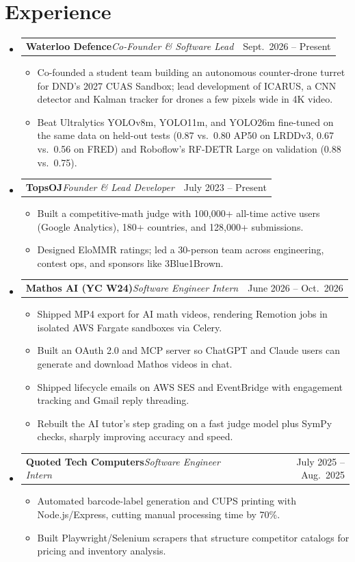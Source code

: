 \documentclass[letterpaper,11pt]{article}
\makeatletter
\newlength{\entrygap}\setlength{\entrygap}{6.5pt}        %
\newlength{\bulletgap}\setlength{\bulletgap}{2.5pt}        %
\newenvironment{entries}
  {\begin{itemize}[leftmargin=0.12in, label={}, itemsep=\entrygap, topsep=0pt, parsep=0pt, partopsep=0pt]}
  {\end{itemize}}
\newenvironment{bullets}
  {\begin{itemize}[leftmargin=0.16in, itemsep=1.25pt, topsep=\bulletgap, parsep=0pt, partopsep=0pt, label={\raisebox{0.15ex}{\scriptsize$\bullet$}}]\small}
  {\end{itemize}}
\newcommand{\role}[3]{%
  \item
  \begin{tabular*}{\linewidth}[t]{l@{\extracolsep{\fill}}r}
    \textbf{#1}\hspace{0.55em}\textit{\small #2} & #3
  \end{tabular*}}
\makeatother
\begin{document}
\section{Experience}
\begin{entries}
  \role{Waterloo Defence}{Co-Founder \& Software Lead}{Sept.\ 2026 -- Present}
  \begin{bullets}
    \item Co-founded a student team building an autonomous counter-drone turret for DND's 2027 CUAS Sandbox; lead development of ICARUS, a CNN detector and Kalman tracker for drones a few pixels wide in 4K video.
    \item Beat Ultralytics YOLOv8m, YOLO11m, and YOLO26m fine-tuned on the same data on held-out tests (0.87 vs.\ 0.80 AP50 on LRDDv3, 0.67 vs.\ 0.56 on FRED) and Roboflow's RF-DETR Large on validation (0.88 vs.\ 0.75).
  \end{bullets}

  \role{TopsOJ}{Founder \& Lead Developer}{July 2023 -- Present}
  \begin{bullets}
    \item Built a competitive-math judge with 100,000+ all-time active users (Google Analytics), 180+ countries, and 128,000+ submissions.
    \item Designed EloMMR ratings; led a 30-person team across engineering, contest ops, and sponsors like 3Blue1Brown.
  \end{bullets}

  \role{Mathos AI (YC W24)}{Software Engineer Intern}{June 2026 -- Oct.\ 2026}
  \begin{bullets}
    \item Shipped MP4 export for AI math videos, rendering Remotion jobs in isolated AWS Fargate sandboxes via Celery.
    \item Built an OAuth 2.0 and MCP server so ChatGPT and Claude users can generate and download Mathos videos in chat.
    \item Shipped lifecycle emails on AWS SES and EventBridge with engagement tracking and Gmail reply threading.
    \item Rebuilt the AI tutor's step grading on a fast judge model plus SymPy checks, sharply improving accuracy and speed.
  \end{bullets}

  \role{Quoted Tech Computers}{Software Engineer Intern}{July 2025 -- Aug.\ 2025}
  \begin{bullets}
    \item Automated barcode-label generation and CUPS printing with Node.js/Express, cutting manual processing time by 70\%.
    \item Built Playwright/Selenium scrapers that structure competitor catalogs for pricing and inventory analysis.
  \end{bullets}
\end{entries}
\end{document}
